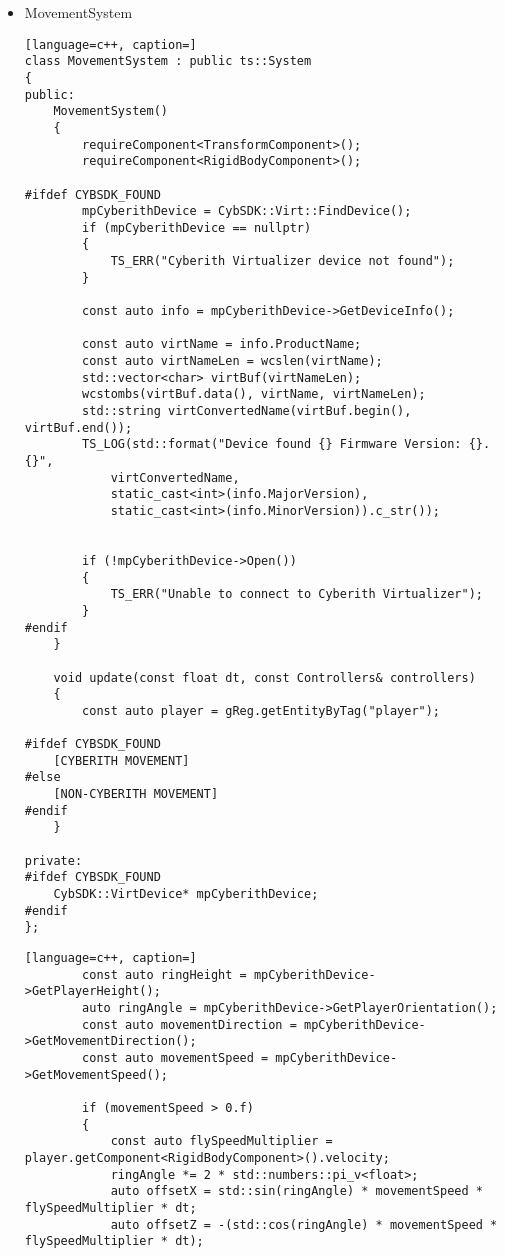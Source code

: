 \begin{itemize}
    \item MovementSystem
    \label{movement_system}
\begin{lstlisting}[language=c++, caption=]
class MovementSystem : public ts::System
{
public:
    MovementSystem()
    {
        requireComponent<TransformComponent>();
        requireComponent<RigidBodyComponent>();

#ifdef CYBSDK_FOUND
        mpCyberithDevice = CybSDK::Virt::FindDevice();
        if (mpCyberithDevice == nullptr)
        {
            TS_ERR("Cyberith Virtualizer device not found");
        }

        const auto info = mpCyberithDevice->GetDeviceInfo();

        const auto virtName = info.ProductName;
        const auto virtNameLen = wcslen(virtName);
        std::vector<char> virtBuf(virtNameLen);
        wcstombs(virtBuf.data(), virtName, virtNameLen);
        std::string virtConvertedName(virtBuf.begin(), virtBuf.end());
        TS_LOG(std::format("Device found {} Firmware Version: {}.{}",
            virtConvertedName,
            static_cast<int>(info.MajorVersion),
            static_cast<int>(info.MinorVersion)).c_str());


        if (!mpCyberithDevice->Open())
        {
            TS_ERR("Unable to connect to Cyberith Virtualizer");
        }
#endif
    }

    void update(const float dt, const Controllers& controllers)
    {
        const auto player = gReg.getEntityByTag("player");

#ifdef CYBSDK_FOUND
    [CYBERITH MOVEMENT]
#else
    [NON-CYBERITH MOVEMENT]
#endif
    }

private:
#ifdef CYBSDK_FOUND
    CybSDK::VirtDevice* mpCyberithDevice;
#endif
};
\end{lstlisting}
\begin{lstlisting}[language=c++, caption=]
        const auto ringHeight = mpCyberithDevice->GetPlayerHeight();
        auto ringAngle = mpCyberithDevice->GetPlayerOrientation();
        const auto movementDirection = mpCyberithDevice->GetMovementDirection();
        const auto movementSpeed = mpCyberithDevice->GetMovementSpeed();

        if (movementSpeed > 0.f)
        {
            const auto flySpeedMultiplier = player.getComponent<RigidBodyComponent>().velocity;
            ringAngle *= 2 * std::numbers::pi_v<float>;
            auto offsetX = std::sin(ringAngle) * movementSpeed * flySpeedMultiplier * dt;
            auto offsetZ = -(std::cos(ringAngle) * movementSpeed * flySpeedMultiplier * dt);


\end{lstlisting}
\end{itemize}
